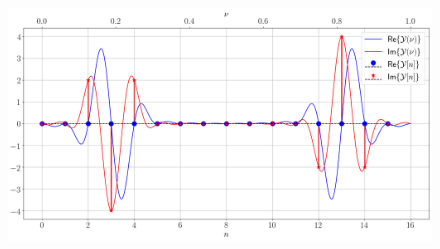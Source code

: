 \begin{figure}[!h]
	\centering
	\includegraphics[width=1.\columnwidth]{pics/spring/1/1-3.png}
	\label{fig:1-3}
\end{figure}
